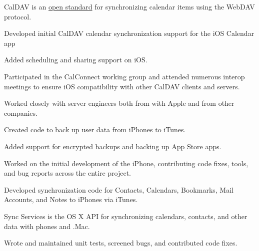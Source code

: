 \begin{cventries}
{\begin{cvsubentries}
{        		}
       		{CalDAV is an \href{https://tools.ietf.org/html/rfc4791}{open standard} for synchronizing calendar items using the WebDAV protocol.
		\vspace{2.0mm}
		\begin{cvitems}
         		\item {Developed initial CalDAV calendar synchronization support for the iOS Calendar app}
			\item {Added scheduling and sharing support on iOS.} 
         		\item {Participated in the CalConnect working group and attended numerous interop meetings to ensure iOS compatibility with other CalDAV clients and servers.}
			\item {Worked closely with server engineers both from with Apple and from other companies.}
         	 \end{cvitems}
        		}
       		{
		\vspace{-2.0mm}
		\begin{cvitems}
         		\item {Created code to back up user data from iPhones to iTunes.}
			\item {Added support for encrypted backups and backing up App Store apps.}
         	 \end{cvitems}
        		}
       		{
		\vspace{-2.0mm}
		\begin{cvitems}
			\item {Worked on the initial development of the iPhone, contributing code fixes, tools, and bug reports across the entire project.}
         		\item {Developed synchronization code for Contacts, Calendars, Bookmarks, Mail Accounts, and Notes to iPhones via iTunes.}
         	 \end{cvitems}
        		}
       		{Sync Services is the OS X API for synchronizing calendars, contacts, and other data with phones and .Mac.
		\vspace{2.0mm}
		\begin{cvitems}
         		\item {Wrote and maintained unit tests, screened bugs, and contributed code fixes.}
         	 \end{cvitems}
        		}
      	\end{cvsubentries}
    }
\end{cventries}